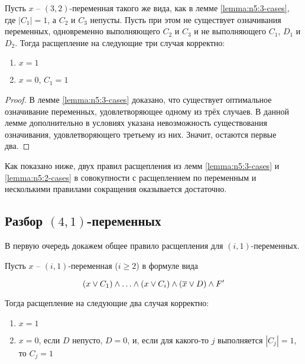 \begin{lemma}
 Пусть $x$ -- $(3,2)$-переменная такого же вида, как в лемме \ref{lemma:n5:3-cases}, где $|C_1| = 1$, а $C_2$ и $C_3$ непусты. Пусть при этом не существует означивания переменных, одновременно выполняющего $C_2$ и $C_3$ и не выполняющего $C_1$, $D_1$ и $D_2$. Тогда расщепление на следующие три случая корректно:

 \begin{enumerate}
  \item $x = 1$
  \item $x = 0$, $C_1 = 1$
 \end{enumerate}
 \label{lemma:n5:2-cases}
\end{lemma}

\begin{proof}
 В лемме \ref{lemma:n5:3-cases} доказано, что существует оптимальное означивание переменных, удовлетворяющее одному из трёх случаев. В данной лемме дополнительно в условиях указана невозможность существования означивания, удовлетворяющего третьему из них. Значит, остаются первые два.
\end{proof}

Как показано ниже, двух правил расщепления из лемм \ref{lemma:n5:3-cases} и \ref{lemma:n5:2-cases} в совокупности с расщеплением по переменным и несколькими правилами сокращения оказывается достаточно.

\subsection{Разбор $(4,1)$-переменных}
\label{subsec:n5:41}

В первую очередь докажем общее правило расщепления для $(i,1)$-переменных.

\begin{lemma}
 Пусть $x$ -- $(i,1)$-переменная ($i \geq 2$) в формуле вида

 $$
  (x \vee C_1) \wedge \ldots \wedge (x \vee C_i) \wedge (\overline{x} \vee D) \wedge F'
 $$

 Тогда расщепление на следующие два случая корректно:
 \begin{enumerate}
  \item $x = 1$
  \item $x = 0$, если $D$ непусто, $D = 0$, и, если для какого-то $j$ выполняется $|C_j| = 1$, то $C_j = 1$
 \end{enumerate}
 \label{lemma:n5:i1}
\end{lemma}

